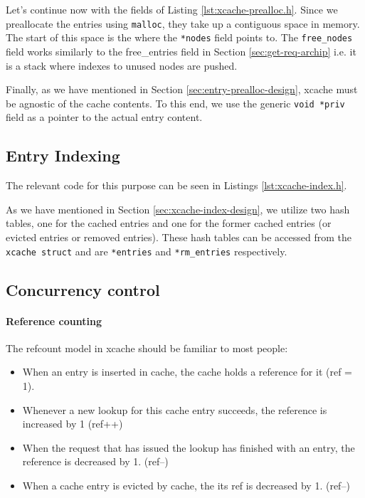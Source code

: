 Let's continue now with the fields of Listing \ref{lst:xcache-prealloc.h}. Since 
we preallocate the entries using \texttt{malloc}, they take up a contiguous 
space in memory.  The start of this space is the where the \texttt{*nodes} field 
points to. The \texttt{free\_nodes} field works similarly to the free\_entries 
field in Section \ref{sec:get-req-archip} i.e. it is a stack where indexes to 
unused nodes are pushed.

Finally, as we have mentioned in Section \ref{sec:entry-prealloc-design}, xcache 
must be agnostic of the cache contents. To this end, we use the generic 
\texttt{void *priv} field as a pointer to the actual entry content.

\subsection{Entry Indexing}

The relevant code for this purpose can be seen in Listings 
\ref{lst:xcache-index.h}.


As we have mentioned in Section \ref{sec:xcache-index-design}, we utilize two 
hash tables, one for the cached entries and one for the former cached entries 
(or evicted entries or removed entries). These hash tables can be accessed from 
the \texttt{xcache struct} and are \texttt{*entries} and \texttt{*rm\_entries} 
respectively.

\subsection{Concurrency control}\label{sec:conc-imp}

\paragraph{Reference counting}\label{par:refcount-imp}

The refcount model in xcache should be familiar to most people:

\begin{itemize}
	\item When an entry is inserted in cache, the cache holds a reference 
		for it (ref = 1).
	\item Whenever a new lookup for this cache entry succeeds, the reference 
		is increased by 1 (ref++)
	\item When the request that has issued the lookup has finished with an 
		entry, the reference is decreased by 1. (ref--)
	\item When a cache entry is evicted by cache, the its ref is decreased 
		by 1. (ref--)
\end{itemize}


